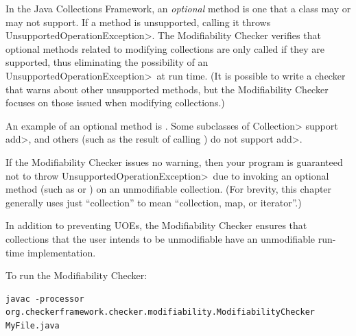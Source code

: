 
\newcommand{\UnsupportedOperationException}{\<Un\-sup\-port\-ed\-Op\-er\-a\-tion\-Ex\-cep\-tion>}

In the Java Collections Framework, an \emph{optional} method is one that a class may or may not support.
If a method is unsupported, calling it throws \UnsupportedOperationException.
The Modifiability Checker verifies that optional methods related to modifying collections are only
called if they are supported, thus eliminating the possibility of an
\UnsupportedOperationException\  at run time.
(It is possible to write a checker that warns about other unsupported
methods, but the Modifiability Checker focuses on those issued when modifying collections.)

An example of an optional method is
.  Some
subclasses of \<Collection> support \<add>, and others (such as the
result of calling
)
do not support \<add>.

If the Modifiability Checker issues no warning, then your program is
guaranteed not to throw \UnsupportedOperationException\ due to invoking an
optional method (such as
 or
)
on an unmodifiable collection.
(For brevity, this chapter generally uses
just ``collection'' to mean ``collection, map, or iterator''.)

In addition to preventing UOEs, the Modifiability Checker ensures that collections
that the user intends to be unmodifiable have an unmodifiable run-time implementation.


To run the Modifiability Checker:

\begin{Verbatim}
javac -processor org.checkerframework.checker.modifiability.ModifiabilityChecker MyFile.java
\end{Verbatim}


